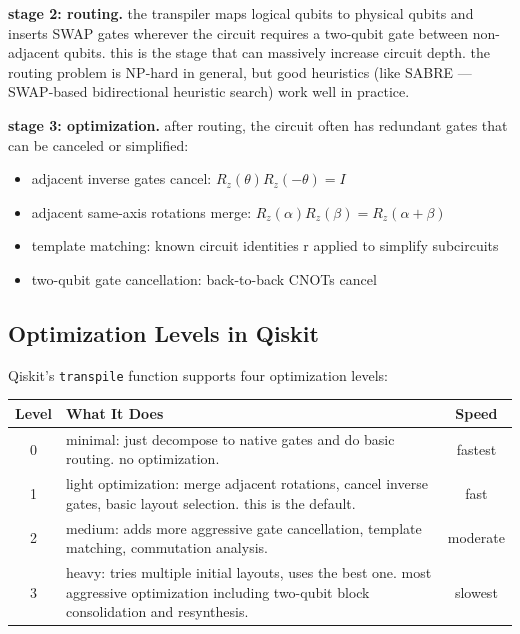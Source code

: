 \documentclass[11pt,a4paper]{article}
\theoremstyle{definition}
\theoremstyle{remark}
\begin{document}
\textbf{stage 2: routing.} the transpiler maps logical qubits to physical qubits and inserts SWAP gates wherever the circuit requires a two-qubit gate between non-adjacent qubits. this is the stage that can massively increase circuit depth. the routing problem is NP-hard in general, but good heuristics (like SABRE --- SWAP-based bidirectional heuristic search) work well in practice.

\textbf{stage 3: optimization.} after routing, the circuit often has redundant gates that can be canceled or simplified:
\begin{itemize}[leftmargin=*]
    \item adjacent inverse gates cancel: $R_z(\theta) R_z(-\theta) = I$
    \item adjacent same-axis rotations merge: $R_z(\alpha) R_z(\beta) = R_z(\alpha + \beta)$
    \item template matching: known circuit identities r applied to simplify subcircuits
    \item two-qubit gate cancellation: back-to-back CNOTs cancel
\end{itemize}

\subsection{Optimization Levels in Qiskit}

Qiskit's \texttt{transpile} function supports four optimization levels:

\begin{center}
\renewcommand{\arraystretch}{1.3}
\begin{tabular}{|c|p{8cm}|c|}
\hline
\textbf{Level} & \textbf{What It Does} & \textbf{Speed} \\
\hline
0 & minimal: just decompose to native gates and do basic routing. no optimization. & fastest \\
\hline
1 & light optimization: merge adjacent rotations, cancel inverse gates, basic layout selection. this is the default. & fast \\
\hline
2 & medium: adds more aggressive gate cancellation, template matching, commutation analysis. & moderate \\
\hline
3 & heavy: tries multiple initial layouts, uses the best one. most aggressive optimization including two-qubit block consolidation and resynthesis. & slowest \\
\hline
\end{tabular}
\end{center}
\end{document}
